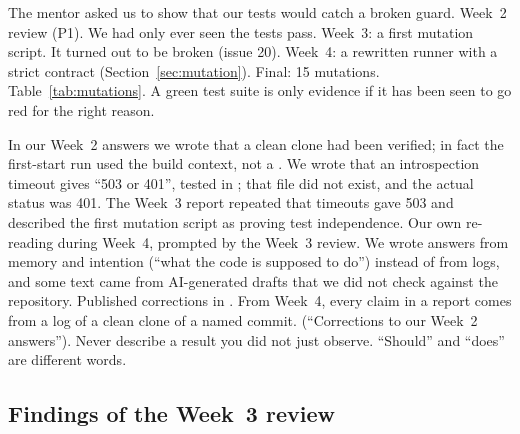 {The mentor asked us to show that our tests would catch a broken guard.}
{Week~2 review (P1).}
{We had only ever seen the tests pass.}
{Week~3: a first mutation script. It turned out to be broken (issue 20). Week~4: a rewritten runner with a strict contract (Section~\ref{sec:mutation}). Final: 15 mutations.}
{Table~\ref{tab:mutations}.}
{A green test suite is only evidence if it has been seen to go red for the right reason.}

{In our Week~2 answers we wrote that a clean clone had been verified; in fact the first-start run used the build context, not a . We wrote that an introspection timeout gives ``503 or 401'', tested in ; that file did not exist, and the actual status was 401. The Week~3 report repeated that timeouts gave 503 and described the first mutation script as proving test independence.}
{Our own re-reading during Week~4, prompted by the Week~3 review.}
{We wrote answers from memory and intention (``what the code is supposed to do'') instead of from logs, and some text came from AI-generated drafts that we did not check against the repository.}
{Published corrections in . From Week~4, every claim in a report comes from a log of a clean clone of a named commit.}
{ (``Corrections to our Week~2 answers'').}
{Never describe a result you did not just observe. ``Should'' and ``does'' are different words.}

\subsection{Findings of the Week~3 review}
\label{sec:mistakes-w3}

